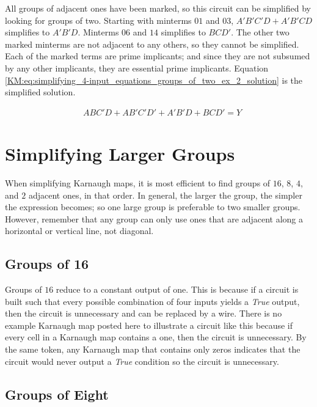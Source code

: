 All groups of adjacent ones have been marked, so this circuit can be simplified by looking for groups of two. Starting with minterms $ 01 $ and $ 03 $, $ A'B'C'D + A'B'CD $ simplifies to $ A'B'D $. Minterms $ 06 $ and $ 14 $ simplifies to $ BCD' $. The other two marked minterms are not adjacent to any others, so they cannot be simplified. Each of the marked terms are prime implicants; and since they are not subsumed by any other implicants, they are essential prime implicants. Equation \ref{KM:eq:simplifying_4-input_equations_groups_of_two_ex_2_solution} is the simplified solution.

\begin{align}
  \label{KM:eq:simplifying_4-input_equations_groups_of_two_ex_2_solution}
  &ABC'D+AB'C'D'+A'B'D+BCD' = Y
\end{align}

\section{Simplifying Larger Groups}
\label{KM:sec:simplifying_larger_groups}

When simplifying Karnaugh maps, it is most efficient to find groups of $ 16 $, $ 8 $, $ 4 $, and $ 2 $ adjacent ones, in that order. In general, the larger the group, the simpler the expression becomes; so one large group is preferable to two smaller groups. However, remember that any group can only use ones that are adjacent along a horizontal or vertical line, not diagonal. 

\subsection{Groups of 16}
\label{KM:subsec:groups_of_16}

Groups of $ 16 $ reduce to a constant output of one. This is because if a circuit is built such that every possible combination of four inputs yields a \emph{True} output, then the circuit is unnecessary and can be replaced by a wire. There is no example Karnaugh map posted here to illustrate a circuit like this because if every cell in a Karnaugh map contains a one, then the circuit is unnecessary. By the same token, any Karnaugh map that contains only zeros indicates that the circuit would never output a \emph{True} condition so the circuit is unnecessary.

\subsection{Groups of Eight}
\label{KM:subsec:groups_of_8}

